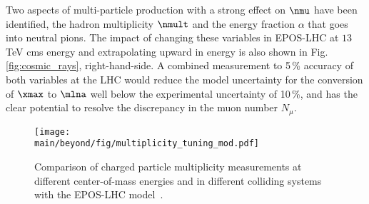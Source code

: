 \documentclass[../report.tex]{subfiles}
\providecommand{\main}{..}
\begin{document}


Two aspects of multi-particle production with a strong effect on $\nmu$ have been identified\cite{Ulrich:2010rg}, the hadron multiplicity $\nmult$ and the energy fraction $\alpha$ that goes into neutral pions. The impact of changing these variables in EPOS-LHC at $13$\,TeV cms energy and extrapolating upward in energy is also shown in Fig.\ref{fig:cosmic_rays}, right-hand-side. A combined measurement to 5\,\% accuracy of both variables at the LHC would reduce the model uncertainty for the conversion of $\xmax$ to $\mlna$ well below the experimental uncertainty of 10\,\%, and has the clear potential to resolve the discrepancy in the muon number $N_\mu$.

\begin{figure}
\texttt{[image: \\main/beyond/fig/multiplicity\_tuning\_mod.pdf]}
\caption{Comparison of charged particle multiplicity measurements at different center-of-mass energies and in different colliding systems with the EPOS-LHC model~\cite{Kim:2018ink}.}
\label{fig:multiplicity_tuning}
\end{figure}
\end{document}
